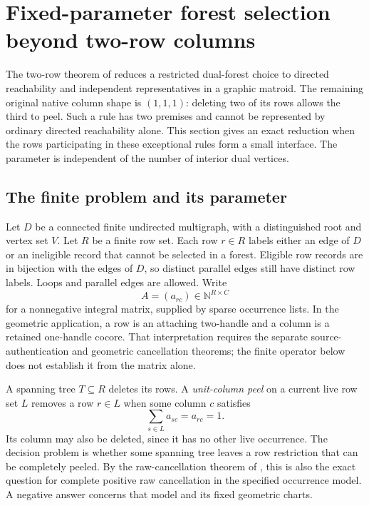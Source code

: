 \section{Fixed-parameter forest selection beyond two-row columns}
\label{sec:exceptional-forest}
\label{sec:exceptional}

The two-row theorem of \cite{IncomingDualNormalization} reduces a restricted
dual-forest choice to directed reachability and independent representatives
in a graphic matroid.  The remaining original native column shape is
$(1,1,1)$: deleting two of its rows allows the third to peel.  Such a rule
has two premises and cannot be represented by ordinary directed
reachability alone.  This section gives an exact reduction when the rows
participating in these exceptional rules form a small interface.  The
parameter is independent of the number of interior dual vertices.

\subsection{The finite problem and its parameter}
\label{subsec:exceptional-problem}

Let $D$ be a connected finite undirected multigraph, with a distinguished
root and vertex set $V$.  Let $R$ be a finite row set.  Each row $r\in R$
labels either an edge of $D$ or an ineligible record that cannot be selected
in a forest.  Eligible row records are in bijection with the edges of
$D$, so distinct parallel edges still have distinct row labels.
Loops and parallel edges are allowed.  Write
\[
                    A=(a_{rc})\in\mathbb{N}^{R\times C}
\]
for a nonnegative integral matrix, supplied by sparse occurrence lists.
In the geometric application, a row is an attaching two-handle and a
column is a retained one-handle cocore.  That interpretation requires the
separate source-authentication and geometric cancellation theorems; the
finite operator below does not establish it from the matrix alone.

A spanning tree $T\subseteq R$ deletes its rows.  A \emph{unit-column peel}
on a current live row set $L$ removes a row $r\in L$ when some column $c$
satisfies
\[
                      \sum_{s\in L}a_{sc}=a_{rc}=1.
\]
Its column may also be deleted, since it has no other live occurrence.
The decision problem is whether some spanning tree leaves a row restriction
that can be completely peeled.  By the raw-cancellation theorem of
\cite{IncomingDualNormalization}, this is also the exact question for
complete positive raw cancellation in the specified occurrence model.
A negative answer concerns that model and its fixed geometric charts.

